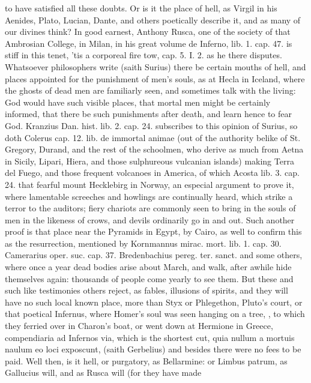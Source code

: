 {to have satisfied all these doubts. Or is it the place of hell, as
Virgil in his Aenides, Plato, Lucian, Dante, and others poetically
describe it, and as many of our divines think? In good earnest, Anthony
Rusca, one of the society of that Ambrosian College, in Milan, in his
great volume de Inferno, lib. 1. cap. 47. is stiff in this tenet, 'tis
a corporeal fire tow, cap. 5. I. 2. as he there disputes. Whatsoever
philosophers write (saith Surius) there be certain mouths of
hell, and places appointed for the punishment of men's souls, as at
Hecla in Iceland, where the ghosts of dead men are familiarly seen, and
sometimes talk with the living: God would have such visible places,
that mortal men might be certainly informed, that there be such
punishments after death, and learn hence to fear God. Kranzius Dan.
hist. lib. 2. cap. 24. subscribes to this opinion of Surius, so doth
Colerus cap. 12. lib. de immortal animae (out of the authority belike
of St. Gregory, Durand, and the rest of the schoolmen, who derive as
much from Aetna in Sicily, Lipari, Hiera, and those sulphureous
vulcanian islands) making Terra del Fuego, and those frequent volcanoes
in America, of which Acosta lib. 3. cap. 24. that fearful mount
Hecklebirg in Norway, an especial argument to prove it, where
lamentable screeches and howlings are continually heard, which strike a
terror to the auditors; fiery chariots are commonly seen to bring in
the souls of men in the likeness of crows, and devils ordinarily go in
and out. Such another proof is that place near the Pyramids in Egypt,
by Cairo, as well to confirm this as the resurrection, mentioned by
Kornmannus mirac. mort. lib. 1. cap. 30. Camerarius oper. suc.
cap. 37. Bredenbachius pereg. ter. sanct. and some others, where once a
year dead bodies arise about March, and walk, after awhile hide
themselves again: thousands of people come yearly to see them. But
these and such like testimonies others reject, as fables, illusions of
spirits, and they will have no such local known place, more than Styx
or Phlegethon, Pluto's court, or that poetical Infernus, where Homer's
soul was seen hanging on a tree, \etc{}, to which they ferried over in
Charon's boat, or went down at Hermione in Greece, compendiaria ad
Infernos via, which is the shortest cut, quia nullum a mortuis naulum
eo loci exposcunt, (saith Gerbelius) and besides there were no
fees to be paid. Well then, is it hell, or purgatory, as Bellarmine: or
Limbus patrum, as Gallucius will, and as Rusca will (for they have made
}
